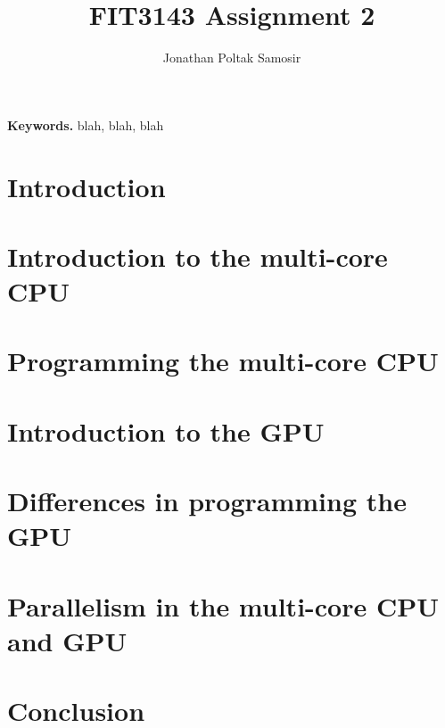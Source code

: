 \documentclass[a4paper,11pt]{article}
\author{Jonathan Poltak Samosir}
\title{FIT3143 Assignment 2}
\begin{document}
\maketitle
\thispagestyle{empty}

\begin{abstract}
\end{abstract}
\smallskip
\noindent \textbf{Keywords.} blah, blah, blah
\newpage
{}
\tableofcontents
\newpage


\section{Introduction}


\section{Introduction to the multi-core CPU}


\section{Programming the multi-core CPU}


\section{Introduction to the GPU}


\section{Differences in programming the GPU}


\section{Parallelism in the multi-core CPU and GPU}


\section{Conclusion}




\end{document}
